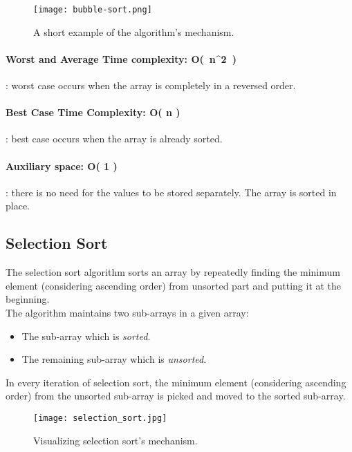 \documentclass{article}
\begin{document}
\begin{figure}
\centering
\texttt{[image: bubble-sort.png]}
\caption{\label{fig:bubble-sort} A short example of the algorithm's mechanism.}
\end{figure}

\paragraph{Worst and Average Time complexity: O(\ n^2\ )}: worst case occurs when the array is completely in a reversed order.

\paragraph{Best Case Time Complexity: O( n )}: best case occurs when the array is already sorted.

\paragraph{Auxiliary space: O( 1 )}: there is no need for the values to be stored separately. The array is sorted in place.
\newline


\subsection{Selection Sort}

The selection sort algorithm sorts an array by repeatedly finding the minimum element (considering ascending order) from unsorted part and putting it at the beginning. \\
The algorithm maintains two sub-arrays in a given array:
\begin{itemize}
    \item The sub-array which is \emph{sorted}.
    \item The remaining sub-array which is \emph{unsorted}.
\end{itemize}

\noindent In every iteration of selection sort, the minimum element (considering ascending order) from the unsorted sub-array is picked and moved to the sorted sub-array.


\begin{figure}[h!]
\centering
\texttt{[image: selection\_sort.jpg]}
\caption{\label{fig:selection_sort} Visualizing selection sort's mechanism.}
\end{figure}
\end{document}

